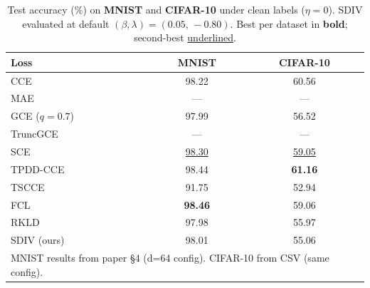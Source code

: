 
\begin{table}[t]
\centering
\caption{Test accuracy (\%) on \textbf{MNIST} and \textbf{CIFAR-10} under
clean labels ($\eta{=}0$).
SDIV evaluated at default $(\beta,\lambda){=}(0.05,\,-0.80)$.
Best per dataset in \textbf{bold}; second-best \underline{underlined}.}
\label{tab:clean_mnist_cifar}
\small
\begin{tabular}{@{}lcc@{}}
\toprule
\textbf{Loss} & \textbf{MNIST} & \textbf{CIFAR-10} \\
\midrule
CCE            & 98.22             & 60.56             \\
MAE            & ---               & ---               \\
GCE ($q{=}0.7$)  & 97.99           & 56.52             \\
TruncGCE       & ---               & ---               \\
SCE            & \underline{98.30} & \underline{59.05} \\
TPDD-CCE       & 98.44             & \textbf{61.16}    \\
TSCCE          & 91.75             & 52.94             \\
FCL            & \textbf{98.46}    & 59.06             \\
RKLD           & 97.98             & 55.97             \\
SDIV (ours)    & 98.01             & 55.06             \\
\midrule
\multicolumn{3}{l}{\footnotesize MNIST results from paper §4 (d=64 config). CIFAR-10 from CSV (same config).} \\
\bottomrule
\end{tabular}
\end{table}

